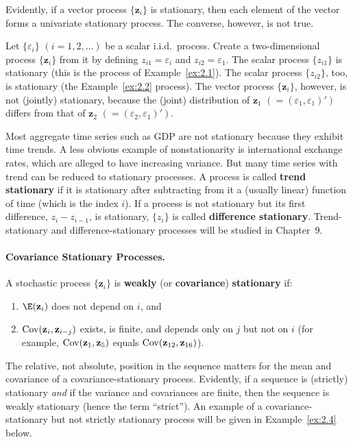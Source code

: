 Evidently, if a vector process $\{\mathbf{z}_i\}$ is stationary, then each element of
the vector forms a univariate stationary process.  The converse, however, is not true.

\begin{example}
\label{ex:2.3}
Let $\{\varepsilon_i\}$ $(i = 1, 2, \ldots)$ be a scalar i.i.d.\ process.  Create a
two-dimensional process $\{\mathbf{z}_i\}$ from it by defining $z_{i1} = \varepsilon_i$
and $z_{i2} = \varepsilon_1$.  The scalar process $\{z_{i1}\}$ is stationary (this is
the process of Example~\ref{ex:2.1}).  The scalar process $\{z_{i2}\}$, too, is
stationary (the Example~\ref{ex:2.2} process).  The vector process
$\{\mathbf{z}_i\}$, however, is not (jointly) stationary, because the (joint)
distribution of $\mathbf{z}_1$ $(= (\varepsilon_1, \varepsilon_1)')$ differs from that
of $\mathbf{z}_2$ $(= (\varepsilon_2, \varepsilon_1)')$.
\end{example}

Most aggregate time series such as GDP are not stationary because they exhibit
time trends.  A less obvious example of nonstationarity is international exchange
rates, which are alleged to have increasing variance.  But many time series with
trend can be reduced to stationary processes.  A process is called
\textbf{trend stationary} if it is stationary after subtracting from it a (usually
linear) function of time (which is the index $i$).  If a process is not stationary
but its first difference, $z_i - z_{i-1}$, is stationary, $\{z_i\}$ is called
\textbf{difference stationary}.  Trend-stationary and difference-stationary processes
will be studied in Chapter~9.

\paragraph{Covariance Stationary Processes.}
A stochastic process $\{\mathbf{z}_i\}$ is \textbf{weakly} (or \textbf{covariance})
\textbf{stationary} if:
\begin{enumerate}[label=(\roman*)]
  \item $\E(\mathbf{z}_i)$ does not depend on $i$, and
  \item $\operatorname{Cov}(\mathbf{z}_i, \mathbf{z}_{i-j})$ exists, is finite, and depends only on
        $j$ but not on $i$ (for example, $\operatorname{Cov}(\mathbf{z}_1, \mathbf{z}_5)$ equals
        $\operatorname{Cov}(\mathbf{z}_{12}, \mathbf{z}_{16})$).
\end{enumerate}
The relative, not absolute, position in the sequence matters for the mean and
covariance of a covariance-stationary process.  Evidently, if a sequence is
(strictly) stationary \emph{and} if the variance and covariances are finite, then
the sequence is weakly stationary (hence the term ``strict'').  An example of a
covariance-stationary but not strictly stationary process will be given in
Example~\ref{ex:2.4} below.

